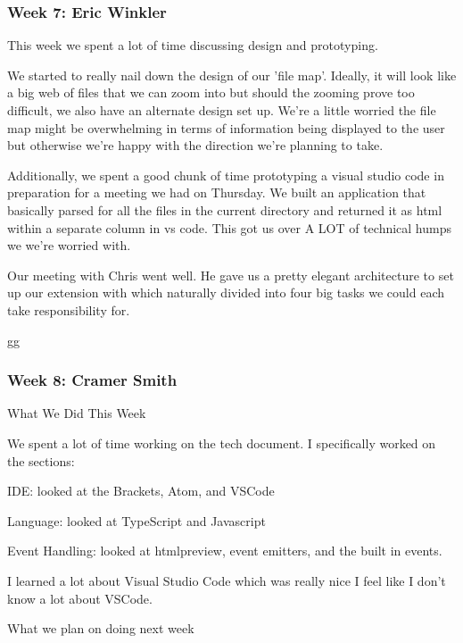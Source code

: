  \subsubsection{Week 7: Eric Winkler}

This week we spent a lot of time discussing design and prototyping. 

We started to really nail down the design of our 'file map'. Ideally, it will look like a big web of files that we can zoom into but should the zooming prove too difficult, we also have an alternate design set up. We're a little worried the file map might be overwhelming in terms of information being displayed to the user but otherwise we're happy with the direction we're planning to take.



Additionally, we spent a good chunk of time prototyping a visual studio code in preparation for a meeting we had on Thursday. We built an application that basically parsed for all the files in the current directory and returned it as html within a separate column in vs code. This got us over A LOT of technical humps we we're worried with.



Our meeting with Chris went well. He gave us a pretty elegant architecture to set up our extension with which naturally divided into four big tasks we could each take responsibility for.



gg \\ 

 \subsubsection{Week 8: Cramer Smith}

What We Did This Week



We spent a lot of time working on the tech document. I specifically worked on the sections:

 IDE: looked at the Brackets, Atom, and VSCode

 Language: looked at TypeScript and Javascript

 Event Handling: looked at htmlpreview, event emitters, and the built in events.

I learned a lot about Visual Studio Code which was really nice I feel like I don't know a lot about VSCode.



What we plan on doing next week

